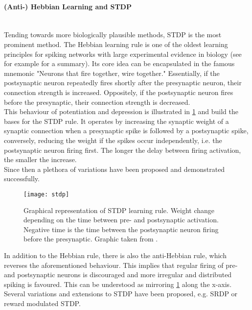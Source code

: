 \paragraph{(Anti-) Hebbian Learning and STDP}\mbox{}\\
Tending towards more biologically plausible methods, \ac{STDP} is the most prominent method. The Hebbian learning rule is one of the oldest learning principles for spiking networks with large experimental evidence in biology (see for example \cite{feldman_spike-timing_2012} for a summary). Its core idea can be encapsulated in the famous mnemonic "Neurons that fire together, wire together." Essentially, if the postsynaptic neuron repeatedly fires shortly after the presynaptic neuron, their connection strength is increased. Oppositely, if the postsynaptic neuron fires before the presynaptic, their connection strength is decreased.\\
This behaviour of potentiation and depression is illustrated in \cref{fig:stdp} and build the bases for the \ac{STDP} rule. It operates by increasing the synaptic weight of a synaptic connection when a presynaptic spike is followed by a postsynaptic spike, conversely, reducing the weight if the spikes occur independently, i.e. the postsynaptic neuron firing first. The longer the delay between firing activation, the smaller the increase.\\
Since then a plethora of variations have been proposed and demonstrated successfully\cite{vigneron_critical_2020,tavanaei_bp-stdp_2019,yamazaki_spiking_2022}.
\begin{figure}
	\centering
	\texttt{[image: stdp]}
	\caption{Graphical representation of STDP learning rule. Weight change depending on the time between pre- and postsynaptic activation. Negative time is the time between the postsynaptic neuron firing before the presynaptic. Graphic taken from \cite{yi_learning_2023}.}
	\label{fig:stdp}
\end{figure}
In addition to the Hebbian rule, there is also the anti-Hebbian rule, which reverses the aforementioned behaviour. This implies that regular firing of pre- and postsynaptic neurons is discouraged and more irregular and distributed spiking is favoured. This can be understood as mirroring \cref{fig:stdp} along the x-axis.\\
Several variations and extensions to \ac{STDP} have been proposed, e.g. \ac{SRDP}\cite{kempter_hebbian_1999} or reward modulated \ac{STDP}\cite{legenstein_learning_2008}.\\

